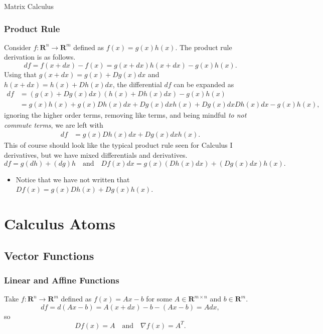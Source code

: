 \begin{chapter}{Matrix Calculus}
    \subsubsection{Product Rule}
    Consider $f: \mathbf{R}^n \to \mathbf{R}^m$ defined as $f(x) = g(x)h(x)$. The product rule
    derivation is as follows.
    \[df = f(x + dx) - f(x) = g(x + dx)h(x + dx) - g(x)h(x).\]
    Using that $g(x + dx) = g(x) + Dg(x)dx$ and $h(x + dx) = h(x) + Dh(x)dx$, 
    the differential $df$ can be expanded as
    \[\begin{aligned}
        df &= \left(g(x) + Dg(x)dx \right) \left(h(x) + Dh(x)dx\right) - g(x)h(x) \\
        &= g(x)h(x) + g(x)Dh(x)dx + Dg(x)dxh(x) + Dg(x)dxDh(x)dx - g(x)h(x),
    \end{aligned}\]
    ignoring the higher order terms, removing like terms, and being mindful \textit{to not commute terms},
    we are left with
    \[\begin{aligned}
        df &= g(x)Dh(x)dx + Dg(x)dxh(x).
    \end{aligned}\]
    This of course should look like the typical product rule seen for Calculus I derivatives,
    but we have mixed differentials and derivatives. 
    \[df = g (dh) + (dg)h \quad \text{and} \quad Df(x)dx = g(x)\left(Dh(x)dx\right) + \left(Dg(x)dx\right) h(x).\]
    \begin{itemize}
        \item Notice that we have not written that $Df(x) = g(x)Dh(x) + Dg(x) h(x)$.
    \end{itemize}

    \section{Calculus Atoms}


    \subsection{Vector Functions}

    \subsubsection*{Linear and Affine Functions}
    Take $f: \mathbf{R}^n \to \mathbf{R}^m$ defined as $f(x) = Ax - b$ for some $A \in \mathbf{R}^{m \times n}$
    and $b \in \mathbf{R}^m$.
    \[df = d(Ax - b) = A(x + dx) - b - (Ax - b) = Adx,\]
    so
    \[Df(x) = A \quad \text{and} \quad \nabla f(x) = A^T.\]


\end{chapter}
